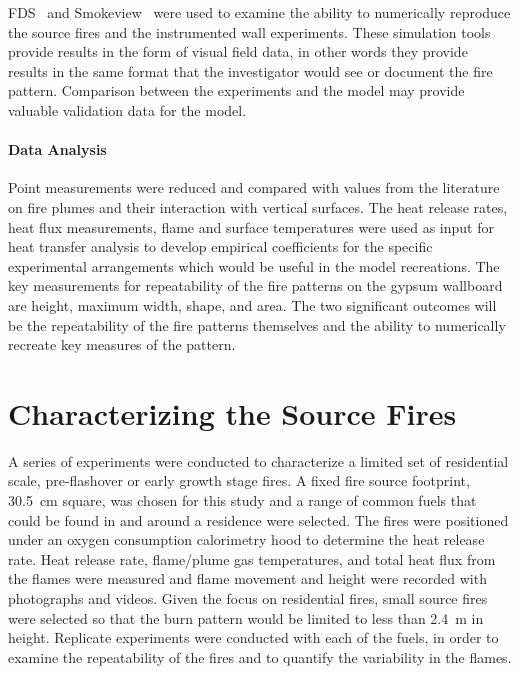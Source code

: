 \documentclass[twoside]{uocthesis}
\begin{document}
{FDS~\cite{McGrattan:2014} and Smokeview~\cite{Forney:2014} were used to examine the ability to numerically reproduce the source fires and the instrumented wall experiments. These simulation tools provide results in the form of visual field data, in other words they provide results in the same format that the investigator would see or document the fire pattern.  Comparison between the experiments and the model may provide valuable validation data for the model.

\subsubsection{Data Analysis}

Point measurements were reduced and compared with values from the literature on fire plumes and their interaction with vertical surfaces.  The heat release rates, heat flux measurements, flame and surface temperatures were used as input for heat transfer analysis to develop empirical coefficients for the specific experimental arrangements which would be useful in the model recreations.
The key measurements for repeatability of the fire patterns on the gypsum wallboard are height, maximum width, shape, and area.  The two significant outcomes will be the repeatability of the fire patterns themselves and the ability to numerically recreate key measures of the pattern.


\chapter{Characterizing the Source Fires}
\label{chapter:Characterizing the Source Fires}

A series of experiments were conducted to characterize a limited set of  residential scale, pre-flashover or early growth stage fires.  A fixed fire source footprint, 30.5~cm square, was chosen for this study and a range of common fuels that could be found in and around a residence were selected.  The fires were positioned under an oxygen consumption calorimetry hood to determine the heat release rate.  Heat release rate, flame/plume gas temperatures, and total heat flux from the flames were measured and flame movement and height were recorded with photographs and videos.  Given the focus on residential fires, small source fires were selected so that the burn pattern would be limited to less than 2.4~m in height.  Replicate experiments were conducted with each of the fuels, in order to examine the repeatability of the fires and to quantify the variability in the flames.

}
\end{document}
